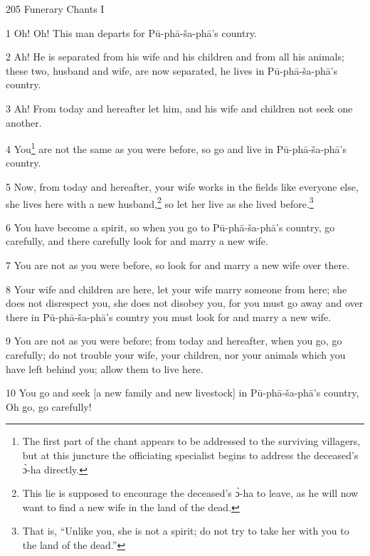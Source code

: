 
205 Funerary Chants I

1 Oh! Oh! This man departs for Pū-phā-ša-phā's country.

2 Ah! He is separated from his wife and his children and from all his animals;
these two, husband and wife, are now separated, he lives in Pū-phā-ša-phā's
country.

3 Ah! From today and hereafter let him, and his wife and children not seek one
another.

4 You\footnote{The first part of the chant appears to be addressed to the surviving villagers, but at this juncture the officiating specialist begins to address the deceased's ɔ̀-ha directly.} are not the same as you were before, so go and live in Pū-phā-ša-phā's
country.

5 Now, from today and hereafter, your wife works in the fields like everyone else,
she lives here with a new husband,\footnote{This lie is supposed to encourage the deceased's ɔ̀-ha to leave, as he will now want to find a new wife in the land of the dead.} so let her live as she lived before.\footnote{That is, ``Unlike you, she is not a spirit; do not try to take her with you to the land of the dead.''}

6 You have become a spirit, so when you go to Pū-phā-ša-phā's country, go
carefully, and there carefully look for and marry a new wife.

7 You are not as you were before, so look for and marry a new wife over there.

8 Your wife and children are here, let your wife marry someone from here; she does
not disrespect you, she does not disobey you, for you must go away and over there
in Pū-phā-ša-phā's country you must look for and marry a new wife.

9 You are not as you were before; from today and hereafter, when you go, go carefully;
do not trouble your wife, your children, nor your animals which you have left behind
you; allow them to live here.

10 You go and seek [a new family and new livestock] in Pū-phā-ša-phā's country,
Oh go, go carefully!

